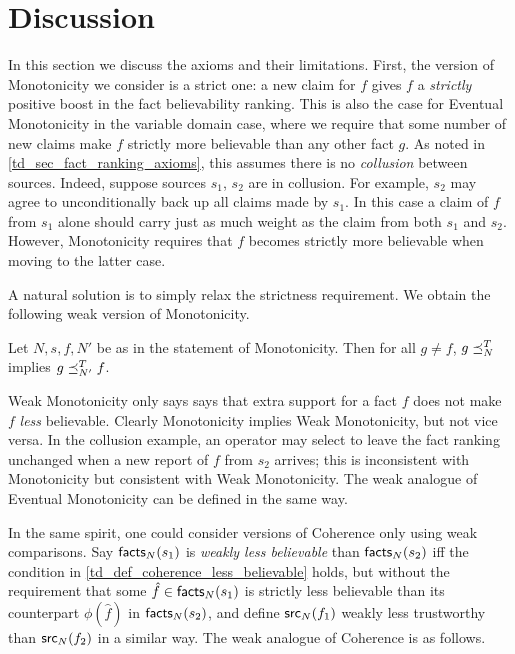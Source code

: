 \section{Discussion}
\label{td_sec_discussion}

In this section we discuss the axioms and their limitations.
%
First, the version of Monotonicity we consider is a strict one: a new claim for
$f$ gives $f$ a \emph{strictly} positive boost in the fact believability
ranking. This is also the case for Eventual Monotonicity in the variable domain
case, where we require that some number of new claims make $f$ strictly more
believable than any other fact $g$. As noted in \cref{td_sec_fact_ranking_axioms},
this assumes there is no \emph{collusion} between sources. Indeed, suppose
sources $s_1$, $s_2$ are in collusion. For example, $s_2$ may agree to
unconditionally back up all claims made by $s_1$. In this case a claim of $f$
from $s_1$ alone should carry just as much weight as the claim from both $s_1$
and $s_2$. However, Monotonicity requires that $f$ becomes strictly more
believable when moving to the latter case.

A natural solution is to simply relax the strictness requirement. We obtain the
following weak version of Monotonicity.

\begin{axiom}
Let $N, s, f, N'$ be as in the statement of Monotonicity. Then for all $g \ne
f$, $g \preceq_N^T$ implies $g \preceq_{N'}^T f$.
\end{axiom}

Weak Monotonicity only says says that extra support for a fact $f$ does not
make $f$ \emph{less} believable. Clearly Monotonicity implies Weak
Monotonicity, but not vice versa. In the collusion example, an operator may
select to leave the fact ranking unchanged when a new report of $f$ from $s_2$
arrives; this is inconsistent with Monotonicity but consistent with Weak
Monotonicity. The weak analogue of Eventual Monotonicity can be defined in the
same way.

In the same spirit, one could consider versions of Coherence only using weak
comparisons. Say $\mathsf{facts}_N(s_1)$ is \emph{weakly less believable} than
$\mathsf{facts}_N(s_2)$ iff the condition in \cref{td_def_coherence_less_believable}
holds, but without the requirement that some $\hat{f} \in \mathsf{facts}_N(s_1)$ is
strictly less believable than its counterpart $\phi(\hat{f})$ in
$\mathsf{facts}_N(s_2)$, and define $\mathsf{src}_N(f_1)$ weakly less trustworthy than
$\mathsf{src}_N(f_2)$ in a similar way. The weak analogue of Coherence is as follows.


